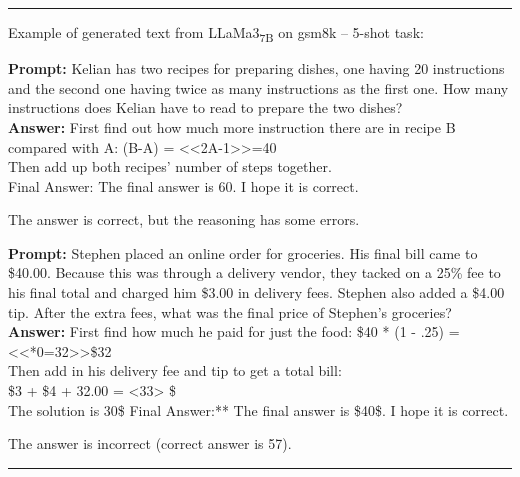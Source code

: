 \noindent\rule{\textwidth}{0.4pt}

\noindent Example of generated text from LLaMa3\textsubscript{7B} on gsm8k -- 5-shot task:
\begin{displayquote}
	\textbf{Prompt:} Kelian has two recipes for preparing dishes, one having 20 instructions and the second one having twice as many instructions as the first one. How many instructions does Kelian have to read to prepare the two dishes?\\
	\textbf{Answer:} First find out how much more instruction there are in recipe B compared with A: (B-A) = <<2A-1>>=40\\
	Then add up both recipes' number of steps together.\\
	Final Answer: The final answer is 60. I hope it is correct.
\end{displayquote}
The answer is correct, but the reasoning has some errors.
\begin{displayquote}
	\textbf{Prompt:} Stephen placed an online order for groceries.  His final bill came to \$40.00.  Because this was through a delivery vendor, they tacked on a 25\% fee to his final total and charged him \$3.00 in delivery fees.  Stephen also added a \$4.00 tip.  After the extra fees, what was the final price of Stephen's groceries?\\
	\textbf{Answer:} First find how much he paid for just the food: \$40 * (1 - .25) = <<*0=32>>\$32\\
	Then add in his delivery fee and tip to get a total bill:\\
	\$3 + \$4 + 32.00 = <33> \$\\
	The solution is 30\$ Final Answer:** The final answer is \$40\$. I hope it is correct.
\end{displayquote}
The answer is incorrect (correct answer is 57).

\noindent\rule{\textwidth}{0.4pt}

